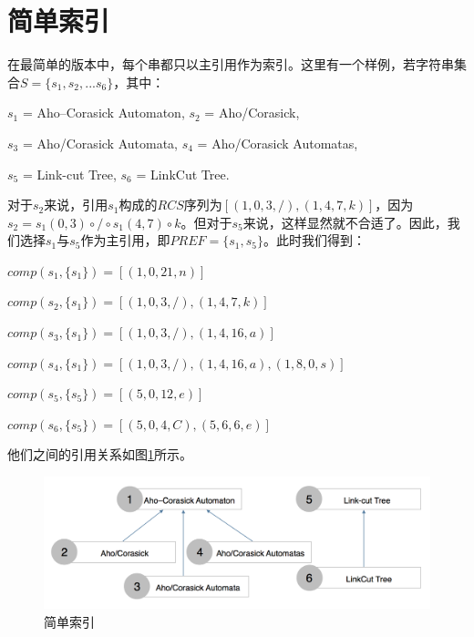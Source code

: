 ﻿\documentclass{sysuthesis}
\begin{document}
\section{简单索引}
在最简单的版本中，每个串都只以主引用作为索引。这里有一个样例，若字符串集合$S = \{s_{1}, s_{2}, ... s_{6}\}$，其中：\par
\hspace{1cm}$s_{1}$ = Aho–Corasick Automaton, $s_{2}$ = Aho/Corasick,\par
\hspace{1cm}$s_{3}$ = Aho/Corasick Automata, $s_{4}$ = Aho/Corasick Automatas,\par
\hspace{1cm}$s_{5}$ = Link-cut Tree, $s_{6}$ = LinkCut Tree.\par
对于$s_{2}$来说，引用$s_{1}$构成的$RCS$序列为$[(1, 0, 3, /), (1, 4, 7, k)]$，因为$s_{2} = s_{1}(0, 3) \circ / \circ s_{1}(4, 7) \circ k$。但对于$s_{5}$来说，这样显然就不合适了。因此，我们选择$s_{1}$与$s_{5}$作为主引用，即$PREF = \{s_{1}, s_{5}\}$。此时我们得到：\par
\hspace{1cm}$comp(s_{1}, \{s_{1}\}) = [(1, 0, 21, n)]$\par
\hspace{1cm}$comp(s_{2}, \{s_{1}\}) = [(1, 0, 3, /), (1, 4, 7, k)]$\par
\hspace{1cm}$comp(s_{3}, \{s_{1}\}) = [(1, 0, 3, /), (1, 4, 16, a)]$\par
\hspace{1cm}$comp(s_{4}, \{s_{1}\}) = [(1, 0, 3, /), (1, 4, 16, a), (1, 8, 0, s)]$\par
\hspace{1cm}$comp(s_{5}, \{s_{5}\}) = [(5, 0, 12, e)]$\par
\hspace{1cm}$comp(s_{6}, \{s_{5}\}) = [(5, 0, 4, C), (5, 6, 6, e)]$\par
他们之间的引用关系如图\ref{image:csimple}所示。\par

\begin{figure}[htbp]
	\centering
	\includegraphics[scale=0.3]{image/csimple.png}
	\caption{简单索引}\label{image:csimple}
\end{figure}
\end{document}

